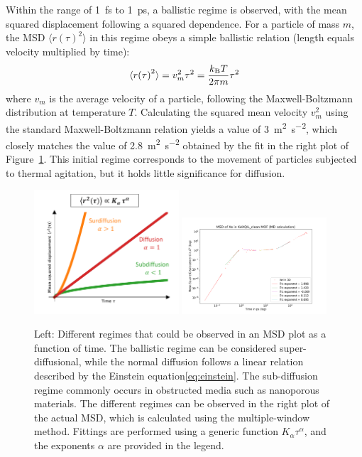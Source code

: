\documentclass[main]{subfiles}
\begin{document}
Within the range of \SI{1}{\fs} to \SI{1}{\ps}, a ballistic regime is observed, with the mean squared displacement following a squared dependence. For a particle of mass $m$, the MSD $\langle {r(\tau)}^2 \rangle$ in this regime obeys a simple ballistic relation (length equals velocity multiplied by time):
\begin{equation}
  \langle {r(\tau)}^2 \rangle = v_m^2 \tau^2 = \frac{k_{\text{B}}T}{2\pi m}\tau^2
\end{equation}
where $v_m$ is the average velocity of a particle, following the Maxwell-Boltzmann distribution at temperature $T$. Calculating the squared mean velocity $v_m^2$ using the standard Maxwell-Boltzmann relation yields a value of \SI{3}{\square\m\per\square\second}, which closely matches the value of \SI{2.8}{\square\m\per\square\second} obtained by the fit in the right plot of Figure~\ref{fgr:MSD_init}. This initial regime corresponds to the movement of particles subjected to thermal agitation, but it holds little significance for diffusion.

\begin{figure}[ht]
  \centering
    \includegraphics[width=0.48\textwidth]{figures/5-diffusion/MSD_anomalous_diffusion.pdf}
    \includegraphics[width=0.48\textwidth]{figures/5-diffusion/MSD_Xe_KAXQIL_clean.pdf}
    \caption{Left: Different regimes that could be observed in an MSD plot as a function of time. The ballistic regime can be considered super-diffusional, while the normal diffusion follows a linear relation described by the Einstein equation\ref{eq:einstein}. The sub-diffusion regime commonly occurs in obstructed media such as nanoporous materials. The different regimes can be observed in the right plot of the actual MSD, which is calculated using the multiple-window method. Fittings are performed using a generic function $K_\alpha\tau^\alpha$, and the exponents $\alpha$ are provided in the legend. }\label{fgr:MSD_init}
\end{figure}
\end{document}
